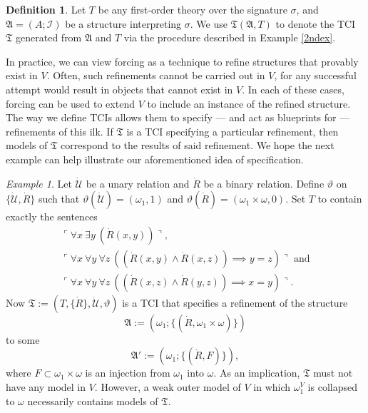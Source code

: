 \documentclass[12pt, twoside]{memoir}
\numberwithin{equation}{section}
\theoremstyle{definition}
\newtheorem{defi}[thm]{Definition}
\theoremstyle{remark}
\newtheorem{ex}[thm]{Example}
\theoremstyle{definition}
\theoremstyle{definition}
\theoremstyle{definition}
\theoremstyle{remark}
\begin{document}
\begin{defi}
Let $T$ be any first-order theory over the signature $\sigma$, and $\mathfrak{A} = (A; \mathcal{I})$ be a structure interpreting $\sigma$. We use $\mathfrak{T}(\mathfrak{A}, T)$ to denote the TCI $\mathfrak{T}$ generated from $\mathfrak{A}$ and $T$ via the procedure described in Example \ref{2ndex}.
\end{defi}

In practice, we can view forcing as a technique to refine structures that provably exist in $V$. Often, such refinements cannot be carried out in $V$, for any successful attempt would result in objects that cannot exist in $V$. In each of these cases, forcing can be used to extend $V$ to include an instance of the refined structure. The way we define TCIs allows them to specify --- and act as blueprints for --- refinements of this ilk. If $\mathfrak{T}$ is a TCI specifying a particular refinement, then models of $\mathfrak{T}$ correspond to the results of said refinement. We hope the next example can help illustrate our aforementioned idea of specification.

\begin{ex}\label{3rdex}
Let $\dot{\mathcal{U}}$ be a unary relation and $\dot{R}$ be a binary relation. Define $\vartheta$ on $\{\dot{\mathcal{U}}, \dot{R}\}$ such that $\vartheta(\dot{\mathcal{U}}) = (\omega_1, 1)$ and $\vartheta(\dot{R}) = (\omega_1 \times \omega, 0)$. Set $T$ to contain exactly the sentences 
\begin{gather*}
    \ulcorner \forall x \ \exists y \ (\dot{R}(x, y)) \urcorner \text{,} \\
    \ulcorner \forall x \ \forall y \ \forall z \ ((\dot{R}(x, y) \wedge \dot{R}(x, z)) \implies y = z) \urcorner \text{ and} \\
    \ulcorner \forall x \ \forall y \ \forall z \ ((\dot{R}(x, z) \wedge \dot{R}(y, z)) \implies x = y) \urcorner \text{.}
\end{gather*}
Now $\mathfrak{T} := (T, \{\dot{R}\}, \dot{\mathcal{U}}, \vartheta)$ is a TCI that specifies a refinement of the structure $$\mathfrak{A} := (\omega_1; \{(\dot{R}, \omega_1 \times \omega)\})$$ to some $$\mathfrak{A}' := (\omega_1; \{(\dot{R}, F)\}),$$ where $F \subset \omega_1 \times \omega$ is an injection from $\omega_1$ into $\omega$. As an implication, $\mathfrak{T}$ must not have any model in $V$. However, a weak outer model of $V$ in which $\omega_1^V$ is collapsed to $\omega$ necessarily contains models of $\mathfrak{T}$.
\end{ex}
\end{document}
